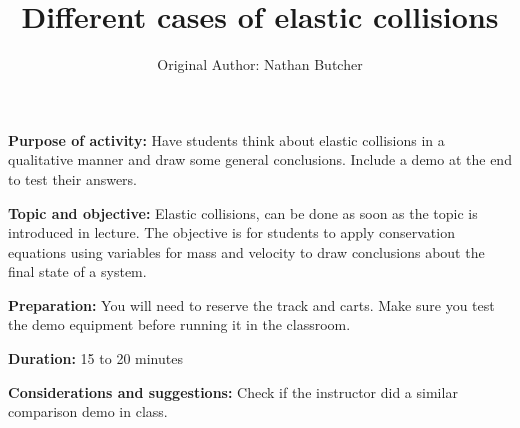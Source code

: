 \documentclass{article}
\title{Different cases of elastic collisions}
\author{Original Author: Nathan Butcher}
\date{}
\begin{document}
\maketitle
\thispagestyle{empty}

\textbf{Purpose of activity:} Have students think about elastic collisions in a qualitative manner and draw some general conclusions. Include a demo at the end to test their answers.

\textbf{Topic and objective:} Elastic collisions, can be done as soon as the topic is introduced in lecture. The objective is for students to apply conservation equations using variables for mass and velocity to draw conclusions about the final state of a system. 

\textbf{Preparation:} You will need to reserve the track and carts. Make sure you test the demo equipment before running it in the classroom. 

\textbf{Duration:} 15 to 20 minutes 

\textbf{Considerations and suggestions:} Check if the instructor did a similar comparison demo in class.

\hspace{14pt}
\end{document}
